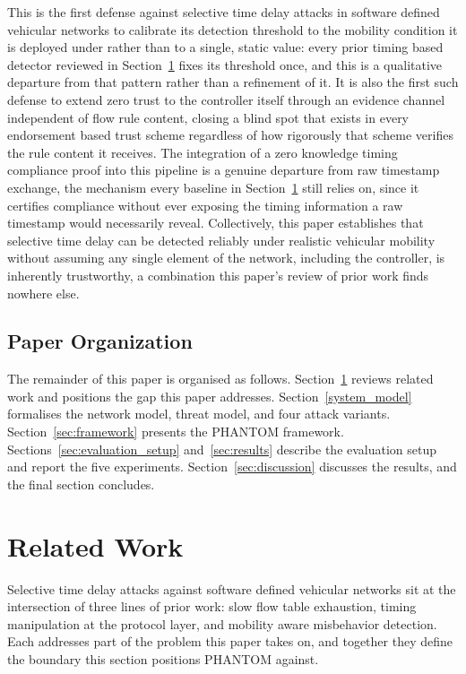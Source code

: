 \documentclass[final,5p,twocolumn]{elsarticle}
\theoremstyle{remark}
\theoremstyle{plain}
\begin{document}
This is the first defense against selective time delay attacks in
software defined vehicular networks to calibrate its detection threshold
to the mobility condition it is deployed under rather than to a single,
static value: every prior timing based detector reviewed in
Section~\ref{sec:related} fixes its threshold once, and this is a
qualitative departure from that pattern rather than a refinement of it.
It is also the first such defense to extend zero trust to the controller
itself through an evidence channel independent of flow rule content,
closing a blind spot that exists in every endorsement based trust scheme
regardless of how rigorously that scheme verifies the rule content it
receives. The integration of a zero knowledge timing compliance proof
into this pipeline is a genuine departure from raw timestamp exchange,
the mechanism every baseline in Section~\ref{sec:related} still relies
on, since it certifies compliance without ever exposing the timing
information a raw timestamp would necessarily reveal. Collectively, this
paper establishes that selective time delay can be detected reliably
under realistic vehicular mobility without assuming any single element of
the network, including the controller, is inherently trustworthy, a
combination this paper's review of prior work finds nowhere else.

\subsection{Paper Organization}

The remainder of this paper is organised as follows. Section~\ref{sec:related}
reviews related work and positions the gap this paper addresses.
Section~\ref{system_model} formalises the network model, threat model,
and four attack variants. Section~\ref{sec:framework} presents the
PHANTOM framework. Sections~\ref{sec:evaluation_setup}
and~\ref{sec:results} describe the evaluation setup and report the five
experiments. Section~\ref{sec:discussion} discusses the results, and the
final section concludes.


\section{Related Work}
\label{sec:related}

Selective time delay attacks against software defined vehicular networks sit
at the intersection of three lines of prior work: slow flow table exhaustion,
timing manipulation at the protocol layer, and mobility aware misbehavior
detection. Each addresses part of the problem this paper takes on, and
together they define the boundary this section positions PHANTOM against.
\end{document}
